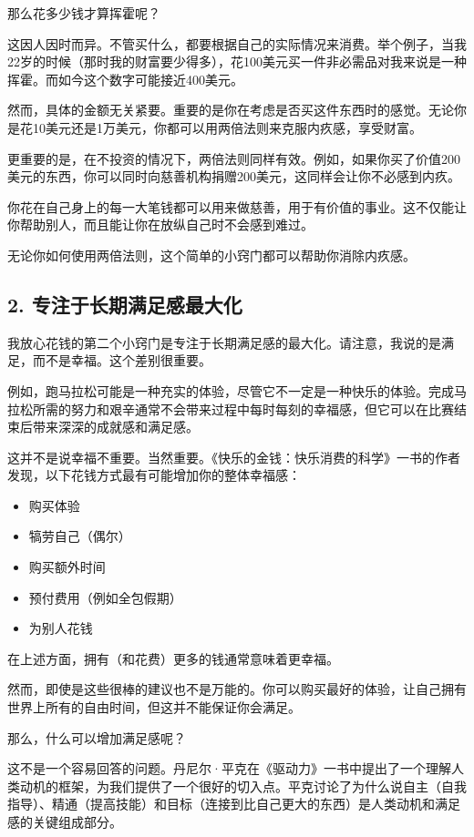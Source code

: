 那么花多少钱才算挥霍呢？

这因人因时而异。不管买什么，都要根据自己的实际情况来消费。举个例子，当我22岁的时候（那时我的财富要少得多），花100美元买一件非必需品对我来说是一种挥霍。而如今这个数字可能接近400美元。

然而，具体的金额无关紧要。重要的是你在考虑是否买这件东西时的感觉。无论你是花10美元还是1万美元，你都可以用两倍法则来克服内疚感，享受财富。

更重要的是，在不投资的情况下，两倍法则同样有效。例如，如果你买了价值200美元的东西，你可以同时向慈善机构捐赠200美元，这同样会让你不必感到内疚。

你花在自己身上的每一大笔钱都可以用来做慈善，用于有价值的事业。这不仅能让你帮助别人，而且能让你在放纵自己时不会感到难过。

无论你如何使用两倍法则，这个简单的小窍门都可以帮助你消除内疚感。

\subsection{2. 专注于长期满足感最大化}
我放心花钱的第二个小窍门是专注于长期满足感的最大化。请注意，我说的是满足，而不是幸福。这个差别很重要。

例如，跑马拉松可能是一种充实的体验，尽管它不一定是一种快乐的体验。完成马拉松所需的努力和艰辛通常不会带来过程中每时每刻的幸福感，但它可以在比赛结束后带来深深的成就感和满足感。

这并不是说幸福不重要。当然重要。《快乐的金钱：快乐消费的科学》一书的作者发现，以下花钱方式最有可能增加你的整体幸福感：

\begin{itemize}
\item 购买体验
\item 犒劳自己（偶尔）
\item 购买额外时间
\item 预付费用（例如全包假期）
\item 为别人花钱
\end{itemize}
在上述方面，拥有（和花费）更多的钱通常意味着更幸福。

然而，即使是这些很棒的建议也不是万能的。你可以购买最好的体验，让自己拥有世界上所有的自由时间，但这并不能保证你会满足。

那么，什么可以增加满足感呢？

这不是一个容易回答的问题。丹尼尔·平克在《驱动力》一书中提出了一个理解人类动机的框架，为我们提供了一个很好的切入点。平克讨论了为什么说自主（自我指导）、精通（提高技能）和目标（连接到比自己更大的东西）是人类动机和满足感的关键组成部分。

